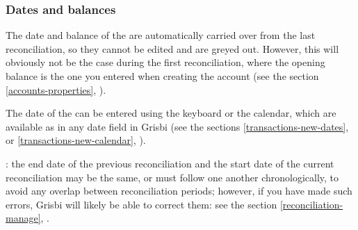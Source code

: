 \subsubsection{Dates and balances\label{reconciliation-account-description-DateBalance}}

The date and balance of the  are automatically carried over from the last reconciliation, so they cannot be edited and are greyed out. However, this will obviously not be the case during the first reconciliation, where the opening balance is the one you entered when creating the account (see the section \vref{accounts-properties}, ).

The date of the  can be entered using the keyboard or the calendar, which are available as in any date field in Grisbi (see the sections \vref{transactions-new-dates},  or \vref{transactions-new-calendar}, ).

\Attention{}: the end date of the previous reconciliation and the start date of the current reconciliation may be the same, or must follow one another chronologically, to avoid any overlap between reconciliation periods; however, if you have made such errors, Grisbi will likely be able to correct them: see the section \vref{reconciliation-manage}, .


